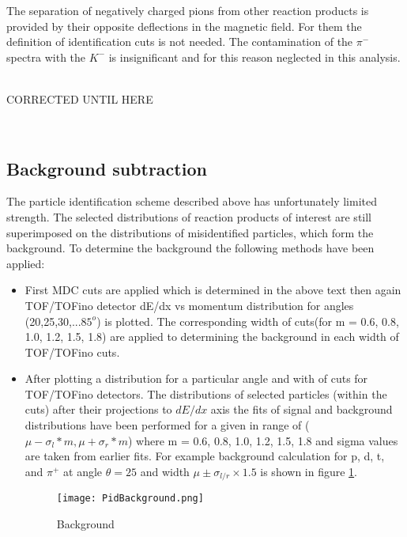   The separation of negatively charged pions from other reaction products is provided by their opposite deflections in the magnetic field. 
  For them the definition of identification cuts is not needed. The contamination of the $\pi^{-}$ spectra with the $K^{-}$ is insignificant 
  and for this reason neglected in this analysis.

  
 \ \\
 
 CORRECTED UNTIL HERE
 
 
 \ \\
 

\subsection{\label{Back_sub} Background subtraction}

The particle identification scheme described above has unfortunately limited strength. The selected distributions of reaction products of interest  
are still superimposed on the distributions of misidentified particles, which form the background. 
To determine the background the following methods have been applied:
\begin{itemize}
	\item First MDC cuts are applied which is determined in the above text then again TOF/TOFino detector dE/dx vs momentum distribution for angles (20,25,30,...$85^o$)  is plotted. The corresponding width of cuts(for m = 0.6, 0.8, 1.0, 1.2, 1.5, 1.8) are applied to determining the background in each width of TOF/TOFino cuts.
	\item After plotting a distribution for a particular angle and with of cuts for TOF/TOFino detectors. The distributions of selected particles (within the cuts) after their projections to $dE/dx$ axis the fits of signal and background distributions have been performed for a given in range of ($\mu-\sigma_l*m , \mu+\sigma_r*m$) where m = 0.6, 0.8, 1.0, 1.2, 1.5, 1.8 and sigma values are taken from earlier fits. For example background calculation for p, d, t, and $\pi^+$ at angle $\theta=25$ and width $\mu \pm \sigma_{l/r}\times1.5$ is shown in figure \ref{backg}.
	\begin{figure}
		\centering
		\texttt{[image: PidBackground.png]}
		\caption{Background}
		\label{backg}
	\end{figure}  
\end{itemize}



